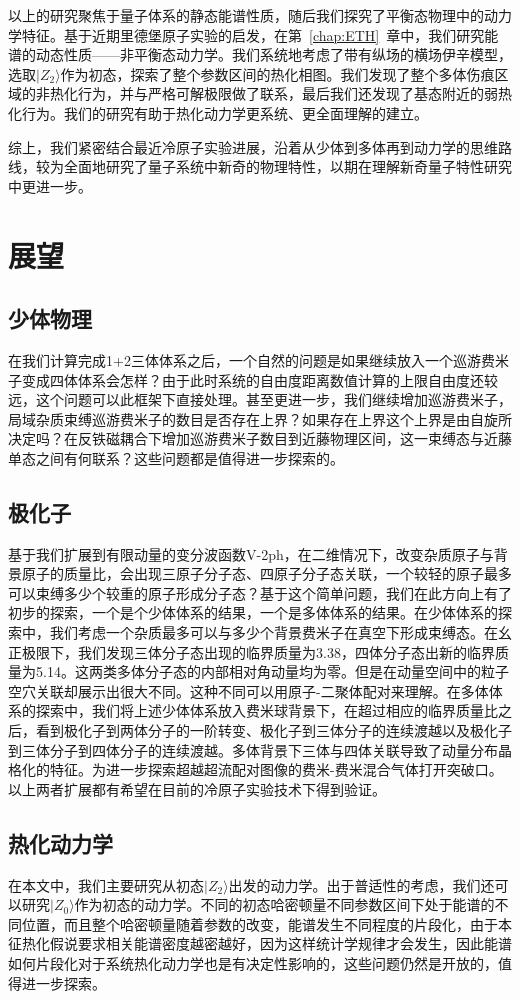 以上的研究聚焦于量子体系的静态能谱性质，随后我们探究了平衡态物理中的动力学特征。基于近期里德堡原子实验的启发，在第~\ref{chap:ETH}~章中，我们研究能谱的动态性质——非平衡态动力学。我们系统地考虑了带有纵场的横场伊辛模型，选取$|Z_2\rangle$作为初态，探索了整个参数区间的热化相图。我们发现了整个多体伤痕区域的非热化行为，并与严格可解极限做了联系，最后我们还发现了基态附近的弱热化行为。我们的研究有助于热化动力学更系统、更全面理解的建立。

综上，我们紧密结合最近冷原子实验进展，沿着从少体到多体再到动力学的思维路线，较为全面地研究了量子系统中新奇的物理特性，以期在理解新奇量子特性研究中更进一步。


\section{展望}
\subsection{少体物理}
在我们计算完成1+2三体体系之后，一个自然的问题是如果继续放入一个巡游费米子变成四体体系会怎样？由于此时系统的自由度距离数值计算的上限自由度还较远，这个问题可以此框架下直接处理。甚至更进一步，我们继续增加巡游费米子，局域杂质束缚巡游费米子的数目是否存在上界？如果存在上界这个上界是由自旋所决定吗？在反铁磁耦合下增加巡游费米子数目到近藤物理区间，这一束缚态与近藤单态之间有何联系？这些问题都是值得进一步探索的。

\subsection{极化子}
基于我们扩展到有限动量的变分波函数V-2ph，在二维情况下，改变杂质原子与背景原子的质量比，会出现三原子分子态、四原子分子态关联，一个较轻的原子最多可以束缚多少个较重的原子形成分子态？基于这个简单问题，我们在此方向上有了初步的探索，一个是个少体体系的结果\cite{RuijinUniversal}，一个是多体体系的结果\cite{RuijinEmergence}。在少体体系的探索中，我们考虑一个杂质最多可以与多少个背景费米子在真空下形成束缚态。在幺正极限下，我们发现三体分子态出现的临界质量为3.38，四体分子态出新的临界质量为5.14。这两类多体分子态的内部相对角动量均为零。但是在动量空间中的粒子空穴关联却展示出很大不同。这种不同可以用原子-二聚体配对来理解。在多体体系的探索中，我们将上述少体体系放入费米球背景下，在超过相应的临界质量比之后，看到极化子到两体分子的一阶转变、极化子到三体分子的连续渡越以及极化子到三体分子到四体分子的连续渡越。多体背景下三体与四体关联导致了动量分布晶格化的特征。为进一步探索超越超流配对图像的费米-费米混合气体打开突破口。以上两者扩展都有希望在目前的冷原子实验技术下得到验证。

\subsection{热化动力学}
在本文中，我们主要研究从初态$|Z_2\rangle$出发的动力学。出于普适性的考虑，我们还可以研究$|Z_0\rangle$作为初态的动力学。不同的初态哈密顿量不同参数区间下处于能谱的不同位置，而且整个哈密顿量随着参数的改变，能谱发生不同程度的片段化，由于本征热化假说要求相关能谱密度越密越好，因为这样统计学规律才会发生，因此能谱如何片段化对于系统热化动力学也是有决定性影响的，这些问题仍然是开放的，值得进一步探索。
